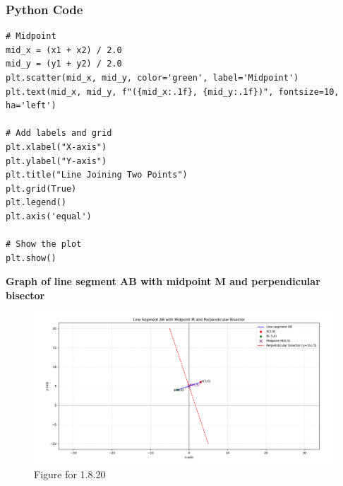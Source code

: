 \documentclass{beamer}
\begin{document}
 \begin{frame}[fragile]
 \frametitle{Python Code}
 \begin{lstlisting}
# Midpoint
mid_x = (x1 + x2) / 2.0
mid_y = (y1 + y2) / 2.0
plt.scatter(mid_x, mid_y, color='green', label='Midpoint')
plt.text(mid_x, mid_y, f"({mid_x:.1f}, {mid_y:.1f})", fontsize=10, ha='left')

# Add labels and grid
plt.xlabel("X-axis")
plt.ylabel("Y-axis")
plt.title("Line Joining Two Points")
plt.grid(True)
plt.legend()
plt.axis('equal')

# Show the plot
plt.show()

\end{lstlisting}
\end{frame}
\begin{frame}
    \vspace{5em}
\textbf{Graph of line segment AB with midpoint M and perpendicular bisector}
\begin{figure}[H]
    \centering
    \includegraphics[width=0.75\columnwidth]{figs/fig1.png}
    \caption{Figure for 1.8.20}
    \label{fig1}
\end{figure}
\end{frame}
\end{document}
